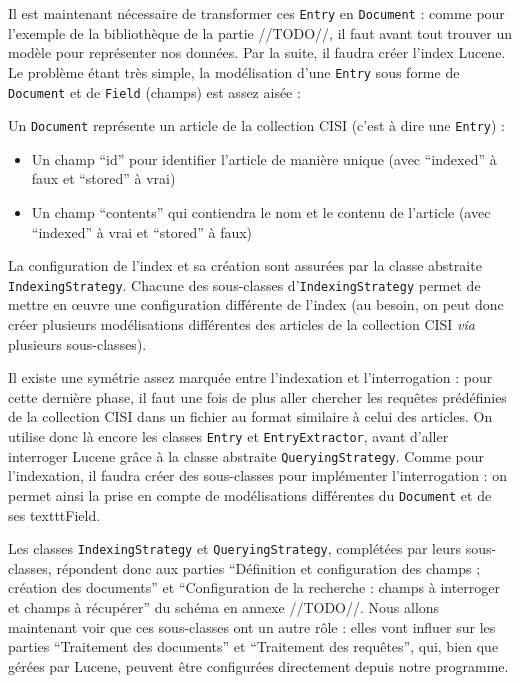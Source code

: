 Il est maintenant nécessaire de transformer ces \texttt{Entry} en \texttt{Document} : comme pour l’exemple de la bibliothèque de la partie //TODO//, il faut avant tout trouver un modèle pour représenter nos données. Par la suite, il faudra créer l’index Lucene.
Le problème étant très simple, la modélisation d’une \texttt{Entry} sous forme de \texttt{Document} et de \texttt{Field} (champs) est assez aisée :

Un \texttt{Document} représente un article de la collection CISI (c’est à dire une \texttt{Entry}) :
\begin{itemize}
\item Un champ “id” pour identifier l’article de manière unique (avec “indexed” à faux et “stored” à vrai)
\item Un champ “contents” qui contiendra le nom et le contenu de l’article (avec “indexed” à vrai et “stored” à faux)
\end{itemize}

La configuration de l’index et sa création sont assurées par la classe abstraite \texttt{IndexingStrategy}. Chacune des sous-classes d’\texttt{IndexingStrategy} permet de mettre en œuvre une configuration différente de l’index (au besoin, on peut donc créer plusieurs modélisations différentes des articles de la collection CISI \textit{via} plusieurs sous-classes).

Il existe une symétrie assez marquée entre l’indexation et l’interrogation : pour cette dernière phase, il faut une fois de plus aller chercher les requêtes prédéfinies de la collection CISI dans un fichier au format similaire à celui des articles. On utilise donc là encore les classes \texttt{Entry} et \texttt{EntryExtractor}, avant d’aller interroger Lucene grâce à la classe abstraite \texttt{QueryingStrategy}. Comme pour l’indexation, il faudra créer des sous-classes pour implémenter l’interrogation : on permet ainsi la prise en compte de modélisations différentes du \texttt{Document} et de ses texttt{Field}.

Les classes \texttt{IndexingStrategy} et \texttt{QueryingStrategy}, complétées par leurs sous-classes, répondent donc aux parties “Définition et configuration des champs ; création des documents” et “Configuration de la recherche : champs à interroger et champs à récupérer” du schéma en annexe //TODO//. Nous allons maintenant voir que ces sous-classes ont un autre rôle : elles vont influer sur les parties “Traitement des documents” et “Traitement des requêtes”, qui, bien que gérées par Lucene, peuvent être configurées directement depuis notre programme.


